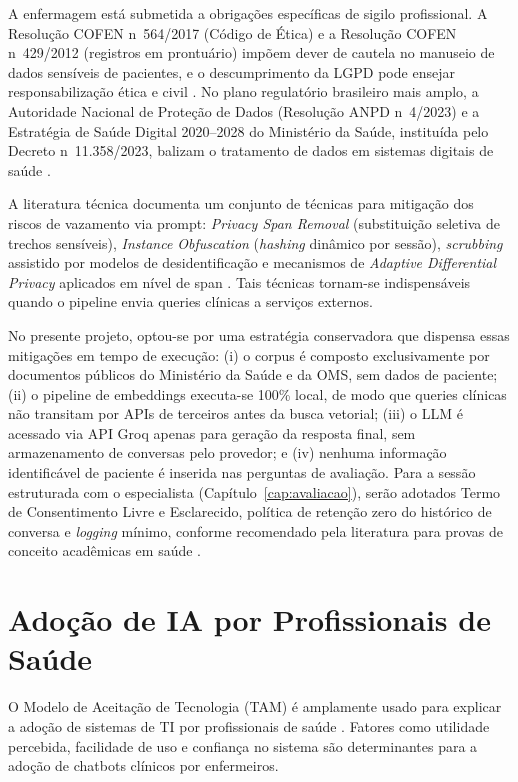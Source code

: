 \documentclass[
  12pt,
  oneside,
  a4paper,
  english,
  brazil
]{abntex2}
\begin{document}
A enfermagem está submetida a obrigações específicas de sigilo profissional. A
Resolução COFEN n\textordmasculine\ 564/2017 (Código de Ética) e a Resolução COFEN
n\textordmasculine\ 429/2012 (registros em prontuário) impõem dever de cautela no
manuseio de dados sensíveis de pacientes, e o descumprimento da LGPD pode ensejar
responsabilização ética e civil \cite{lgpdEnfermagem2022}. No plano regulatório
brasileiro mais amplo, a Autoridade Nacional de Proteção de Dados (Resolução ANPD
n\textordmasculine\ 4/2023) e a Estratégia de Saúde Digital 2020--2028 do Ministério
da Saúde, instituída pelo Decreto n\textordmasculine\ 11.358/2023, balizam o
tratamento de dados em sistemas digitais de saúde \cite{lgpdSaude2023}.

A literatura técnica documenta um conjunto de técnicas para mitigação dos riscos de
vazamento via prompt: \textit{Privacy Span Removal} (substituição seletiva de trechos
sensíveis), \textit{Instance Obfuscation} (\textit{hashing} dinâmico por sessão),
\textit{scrubbing} assistido por modelos de desidentificação e mecanismos de
\textit{Adaptive Differential Privacy} aplicados em nível de span
\cite{sokPrivacyLLM2026, privacyRAGHealthcare2025}. Tais técnicas tornam-se
indispensáveis quando o pipeline envia queries clínicas a serviços externos.

No presente projeto, optou-se por uma estratégia conservadora que dispensa essas
mitigações em tempo de execução: (i) o corpus é composto exclusivamente por documentos
públicos do Ministério da Saúde e da OMS, sem dados de paciente; (ii) o pipeline de
embeddings executa-se 100\% local, de modo que queries clínicas não transitam por APIs
de terceiros antes da busca vetorial; (iii) o LLM é acessado via API Groq apenas para
geração da resposta final, sem armazenamento de conversas pelo provedor; e (iv)
nenhuma informação identificável de paciente é inserida nas perguntas de avaliação.
Para a sessão estruturada com o especialista (Capítulo~\ref{cap:avaliacao}), serão
adotados Termo de Consentimento Livre e Esclarecido, política de retenção zero do
histórico de conversa e \textit{logging} mínimo, conforme recomendado pela literatura
para provas de conceito acadêmicas em saúde \cite{privacyRAGHealthcare2025}.

\section{Adoção de IA por Profissionais de Saúde}
\label{sec:adocao-ref}

O Modelo de Aceitação de Tecnologia (TAM) é amplamente usado para explicar a adoção
de sistemas de TI por profissionais de saúde \cite{nursingTAM2024}. Fatores como
utilidade percebida, facilidade de uso e confiança no sistema são determinantes
para a adoção de chatbots clínicos por enfermeiros.
\end{document}
